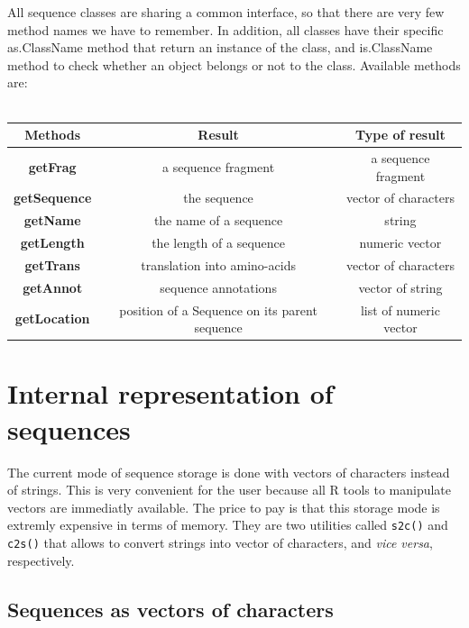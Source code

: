 \documentclass{article}
\begin{document}
All sequence classes are sharing a common interface, so that there are very few method names we have to remember. 
In addition, all classes have their specific as.ClassName method that return an instance of the class,
and is.ClassName method to check whether an object belongs or not to the class. 
Available methods are: 
\\
\\
\begin{tabular}{|@{} c @{}|@{} c @{}|@{} c @{}|}
\hline
{\bfseries Methods} & {\bfseries Result} & {\bfseries Type of result} \\
\hline \hline
{\bfseries getFrag} & a sequence fragment & a sequence fragment \\
\hline
{\bfseries getSequence} & the sequence & vector of characters \\
\hline
{\bfseries getName} & the name of a sequence & string \\
\hline
{\bfseries getLength} & the length of a sequence & numeric vector \\
\hline
{\bfseries getTrans} & translation into amino-acids & vector of characters \\
\hline
{\bfseries getAnnot} & sequence annotations & vector of string \\
\hline
{\bfseries getLocation} & position of a Sequence on its parent sequence & list of numeric vector \\
\hline
\end{tabular}

\section{Internal representation of sequences}

The current mode of sequence storage is done with vectors of characters instead of strings.
This is very convenient for the user because all R tools to manipulate vectors are immediatly available. 
The price to pay is that this storage mode is extremly expensive in terms of memory.
They are two utilities called \texttt{s2c()} and \texttt{c2s()} that allows to convert strings into 
vector of characters, and \textit{vice versa}, respectively.

\subsection{Sequences as vectors of characters}
\end{document}

